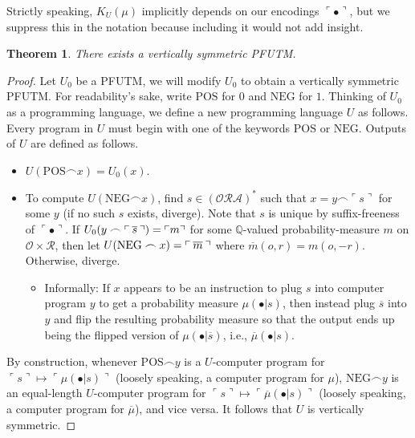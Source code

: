 \documentclass{article}
\newtheorem{theorem}{Theorem}
\begin{document}
Strictly speaking, $K_U(\mu)$ implicitly depends on our encodings
$\ulcorner \bullet\urcorner$, but we suppress this in the notation because
including it would not add insight.

\begin{theorem}
\label{envirosymmetricexistencelemma}
    There exists a vertically symmetric PFUTM.
\end{theorem}

\begin{proof}
    Let $U_0$ be a PFUTM, we will modify $U_0$ to obtain a vertically symmetric PFUTM.
    For readability's sake, write $\mathrm{POS}$ for $0$ and $\mathrm{NEG}$ for $1$.
    Thinking of $U_0$ as a programming language, we define a new programming language
    $U$ as follows. Every program in $U$ must begin with one of the keywords
    $\mathrm{POS}$ or $\mathrm{NEG}$. Outputs of $U$ are defined as follows.
    \begin{itemize}
        \item $U(\mathrm{POS}\frown x)=U_0(x)$.
        \item To compute $U(\mathrm{NEG}\frown x)$, find
        $s\in (\mathcal O \mathcal R\mathcal A)^*$ such that
        $x=y\frown \ulcorner s\urcorner$ for some $y$ (if no such $s$ exists, diverge).
        Note that $s$ is unique by suffix-freeness of $\ulcorner\bullet\urcorner$.
        If $
            U_0(y\frown
            \ulcorner \hspace{.2em} \overline s\hspace{.2em}\urcorner)
            =\ulcorner m\urcorner
        $
        for some $\mathbb Q$-valued probability-measure $m$ on
        $\mathcal O\times\mathcal R$, then let
        $U(\mathrm{NEG}\frown x)=\ulcorner\hspace{.2em} \overline m\hspace{.2em}\urcorner$
        where $\overline m(o,r)=m(o,-r)$.
        Otherwise, diverge.
        \begin{itemize}
            \item Informally:
            If $x$ appears to be an instruction to plug $s$ into computer
            program $y$ to get a probability measure $\mu(\bullet|s)$, then
            instead plug $\overline s$ into $y$ and flip the resulting
            probability measure so that the output
            ends up being the flipped version of $\mu(\bullet|\overline s)$,
            i.e., $\overline \mu(\bullet|s)$.
        \end{itemize}
    \end{itemize}
    By construction, whenever $\mathrm{POS}\frown y$ is a $U$-computer program
    for $\ulcorner s\urcorner\mapsto \ulcorner \mu(\bullet|s)\urcorner$
    (loosely speaking, a computer program for $\mu$),
    $\mathrm{NEG}\frown y$ is an equal-length $U$-computer program
    for $\ulcorner s\urcorner\mapsto \ulcorner \overline\mu(\bullet|s)\urcorner$
    (loosely speaking, a computer program for $\overline \mu$),
    and vice versa.
    It follows that $U$ is vertically symmetric.
\end{proof}
\end{document}
